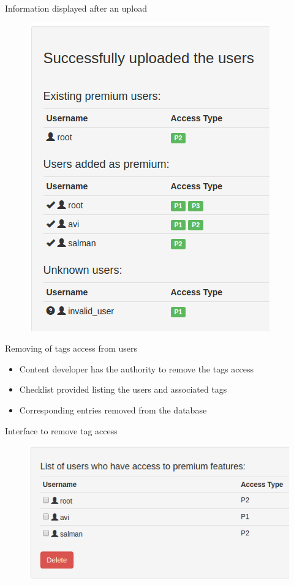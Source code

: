 \documentclass{beamer}
\begin{document}
\begin{frame}
	Information displayed after an upload
	\begin{figure}
	\centering
	\includegraphics[width=0.7\linewidth]{media/usertaguploadsuccess}
	\label{fig:usertaguploadsuccess}
	\end{figure}
\end{frame}

\begin{frame}{Removing of tags access from users}
	\begin{itemize}
		\item Content developer has the authority to remove the tags access
		\item Checklist provided listing the users and associated tags
		\item Corresponding entries removed from the database
	\end{itemize}
\end{frame}

\begin{frame}
	Interface to remove tag access
	\begin{figure}
	\centering
	\includegraphics[width=0.8\linewidth]{media/removeusers}
	\label{fig:removeusers}
	\end{figure}
\end{frame}
\end{document}
